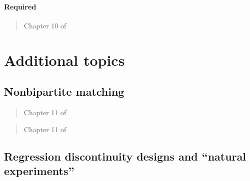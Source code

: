 \documentclass[12pt]{article}
\begin{document}
\paragraph*{Required}

\begin{verse}  \end{verse}

\begin{verse} Chapter 10 of  \end{verse}

\section{Additional topics}

\subsection{Nonbipartite matching}

\begin{verse} Chapter 11 of  \end{verse}

\begin{verse}  \end{verse}

\begin{verse} Chapter 11 of  \end{verse}

\begin{verse}  \end{verse}

\begin{verse}  \end{verse}

\begin{verse}  \end{verse}

\begin{verse}  \end{verse}

\subsection{Regression discontinuity designs and ``natural experiments''}

\begin{verse}  \end{verse}
\end{document}
